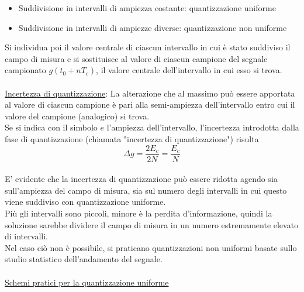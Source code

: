 \documentclass{article}
\begin{document}
\begin{itemize}
    \item Suddivisione in intervalli di ampiezza costante: quantizzazione uniforme 
    \item Suddivisione in intervalli di ampiezze diverse: quantizzazione non uniforme
\end{itemize}
Si individua poi il valore centrale di ciascun intervallo in cui è stato suddiviso il campo di misura e si 
sostituisce al valore di ciascun campione del segnale campionato $g(t_{0}+nT_{c})$, il valore centrale dell'intervallo in 
cui esso si trova. \\\\
\underline{Incertezza di quantizzazione}: La alterazione che al massimo può essere apportata al valore di 
ciascun campione è pari alla semi-ampiezza dell'intervallo entro cui il valore del campione 
(analogico) si trova.\\ Se si indica con il simbolo $e$ l'ampiezza dell'intervallo, l'incertezza introdotta 
dalla fase di quantizzazione (chiamata "incertezza di quantizzazione") risulta 
\begin{equation}
    \Delta g= \frac{2E_{c}}{2N}=\frac{E_{c}}{N}
\end{equation}\\
E' evidente che la incertezza di quantizzazione può essere ridotta agendo sia sull'ampiezza del 
campo di misura, sia sul numero degli intervalli in cui questo viene suddiviso con quantizzazione 
uniforme.\\
Più gli intervalli sono piccoli, minore è la perdita d'informazione, quindi la soluzione sarebbe dividere il campo di misura in un numero estremamente elevato di intervalli.\\
Nel caso ciò non è possibile, si praticano quantizzazioni non uniformi basate sullo studio 
statistico dell'andamento del segnale. \\\\
\underline{Schemi pratici per la quantizzazione uniforme}
\end{document}
